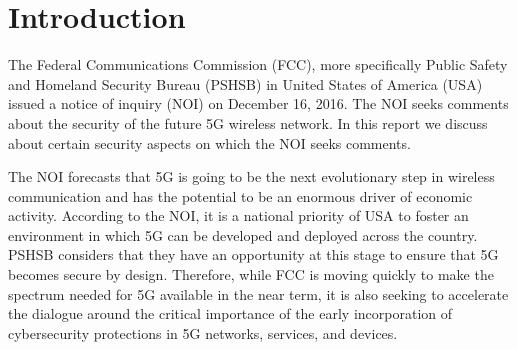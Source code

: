 \documentclass[12pt]{llncs}
\begin{document}
%
%
\author{Mohsin Khan%
\and Valtteri Niemi}  %


%
%

\toctitle{}
\tocauthor{}
\titleGP

\thispagestyle{empty}


\section{Introduction}
\label{intro} 

The Federal Communications Commission (FCC), more specifically Public Safety and Homeland Security Bureau (PSHSB) in United States of America (USA) issued a notice of inquiry (NOI) on December 16, 2016. The NOI seeks comments about the security of the future 5G wireless network. In this report we discuss about certain security aspects on which the NOI seeks comments.

The NOI forecasts that 5G is going to be the next evolutionary step in wireless communication and has the potential to be an enormous driver of economic activity. According to the NOI, it is a national priority of USA to foster an environment in which 5G can be developed and deployed across the country. PSHSB considers that they have an opportunity at this stage to ensure that 5G becomes secure by design. Therefore, while FCC is moving quickly to make the spectrum needed for 5G available in the near term, it is also seeking to accelerate the dialogue around the critical importance of the early incorporation of cybersecurity protections in 5G networks, services, and devices.
\end{document}
